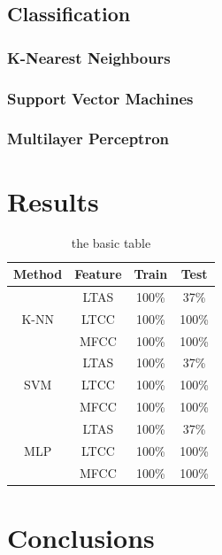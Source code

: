 \documentclass[letterpaper,11pt,leqno]{article}
\newcommand{\bib}{bibliography.bib}
\begin{document}
\subsection{Classification}

\subsubsection{K-Nearest Neighbours}

\subsubsection{Support Vector Machines}

\subsubsection{Multilayer Perceptron}

\section{Results}\label{s:results}

\begin{table}[h!]
\caption{ the basic table}  
\centering
	\begin{tabular}{c c c c}
		\textbf{Method} & \textbf{Feature} & \textbf{Train} & \textbf{Test} \\
		\hline\hline
		\multirow{3}{3em}{K-NN} & LTAS & 100\% & 37\% \\
		& LTCC & 100\% & 100\% \\
		& MFCC & 100\% & 100\% \\
		\hline
		\multirow{3}{3em}{SVM} & LTAS & 100\% & 37\% \\
		& LTCC & 100\% & 100\% \\
		& MFCC & 100\% & 100\% \\
		\hline
		\multirow{3}{3em}{MLP} & LTAS & 100\% & 37\% \\
		& LTCC & 100\% & 100\% \\
		& MFCC & 100\% & 100\% \\
		\hline
	\end{tabular}
\end{table}

\section{Conclusions}\label{s:conclusions}




\end{document}
